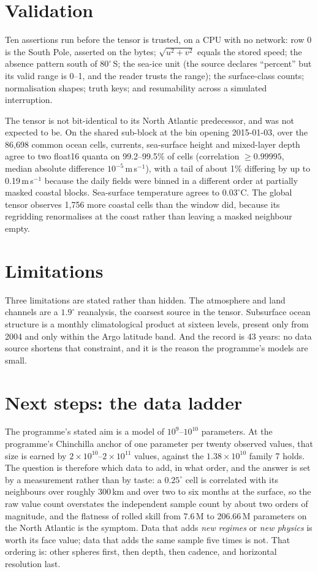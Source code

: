 \documentclass[10pt]{article}
\begin{document}
\section{Validation}

Ten assertions run before the tensor is trusted, on a CPU with no network:
row 0 is the South Pole, asserted on the bytes; $\sqrt{u^2+v^2}$ equals the
stored speed; the absence pattern south of $80^\circ$\,S; the sea-ice unit
(the source declares ``percent'' but its valid range is 0--1, and the reader
trusts the range); the surface-class counts; normalisation shapes; truth
keys; and resumability across a simulated interruption.

The tensor is not bit-identical to its North Atlantic predecessor, and was
not expected to be. On the shared sub-block at the bin opening 2015-01-03,
over the 86,698 common ocean cells, currents, sea-surface height and
mixed-layer depth agree to two float16 quanta on 99.2--99.5\% of cells
(correlation $\geq 0.99995$, median absolute difference $10^{-5}$\,m\,s$^{-1}$),
with a tail of about 1\% differing by up to 0.19\,m\,s$^{-1}$ because the
daily fields were binned in a different order at partially masked coastal
blocks. Sea-surface temperature agrees to $0.03^\circ$C. The global tensor
observes 1,756 more coastal cells than the window did, because its
regridding renormalises at the coast rather than leaving a masked neighbour
empty.

\section{Limitations}

Three limitations are stated rather than hidden. The atmosphere and land
channels are a $1.9^\circ$ reanalysis, the coarsest source in the tensor.
Subsurface ocean structure is a monthly climatological product at sixteen
levels, present only from 2004 and only within the Argo latitude band. And
the record is 43 years: no data source shortens that constraint, and it is
the reason the programme's models are small.

\section{Next steps: the data ladder}

The programme's stated aim is a model of $10^9$--$10^{10}$ parameters. At the
programme's Chinchilla anchor of one parameter per twenty observed values,
that size is earned by $2\times10^{10}$--$2\times10^{11}$ values, against the
$1.38\times10^{10}$ family 7 holds. The question is therefore which data to
add, in what order, and the answer is set by a measurement rather than by
taste: a $0.25^\circ$ cell is correlated with its neighbours over roughly
300\,km and over two to six months at the surface, so the raw value count
overstates the independent sample count by about two orders of magnitude,
and the flatness of rolled skill from 7.6\,M to 206.66\,M parameters on the
North Atlantic is the symptom. Data that adds \emph{new regimes} or
\emph{new physics} is worth its face value; data that adds the same sample
five times is not. That ordering is: other spheres first, then depth, then
cadence, and horizontal resolution last.
\end{document}
